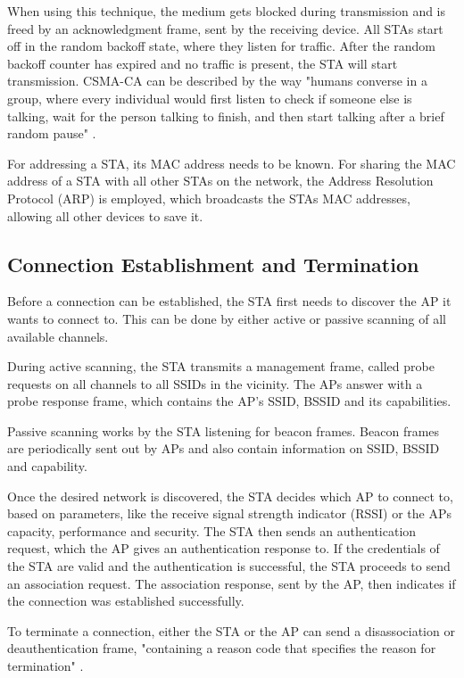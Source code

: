 When using this technique, the medium gets blocked during transmission and is freed by an acknowledgment frame, sent by the receiving device.
All STAs start off in the random backoff state, where they listen for traffic.
After the random backoff counter has expired and no traffic is present, the STA will start transmission.
CSMA-CA can be described by the way "humans converse in a group, where every individual would first listen to check if someone else is talking, wait for the person talking to finish, and then start talking after a brief random pause" \cite[page~12]{Sankaran_Gulasekaran_2021}. \cite{Oriyano_2017} \cite[page~12-17]{Sankaran_Gulasekaran_2021}

For addressing a STA, its MAC address needs to be known.
For sharing the MAC address of a STA with all other STAs on the network, the Address Resolution Protocol (ARP) is employed, which broadcasts the STAs MAC addresses, allowing all other devices to save it.

\subsection{Connection Establishment and Termination}
Before a connection can be established, the STA first needs to discover the AP it wants to connect to.
This can be done by either active or passive scanning of all available channels.

During active scanning, the STA transmits a management frame, called probe requests on all channels to all SSIDs in the vicinity.
The APs answer with a probe response frame, which contains the AP's SSID, BSSID and its capabilities.

Passive scanning works by the STA listening for beacon frames.
Beacon frames are periodically sent out by APs and also contain information on SSID, BSSID and capability. \cite[page~18]{Sankaran_Gulasekaran_2021}

Once the desired network is discovered, the STA decides which AP to connect to, based on parameters, like the receive signal strength indicator (RSSI) or the APs capacity, performance and security.
The STA then sends an authentication request, which the AP gives an authentication response to.
If the credentials of the STA are valid and the authentication is successful, the STA proceeds to send an association request.
The association response, sent by the AP, then indicates if the connection was established successfully.

To terminate a connection, either the STA or the AP can send a disassociation or deauthentication frame, "containing a reason code that specifies the reason for termination" \cite[page~20]{Sankaran_Gulasekaran_2021}. \cite[page~19]{Sankaran_Gulasekaran_2021}

